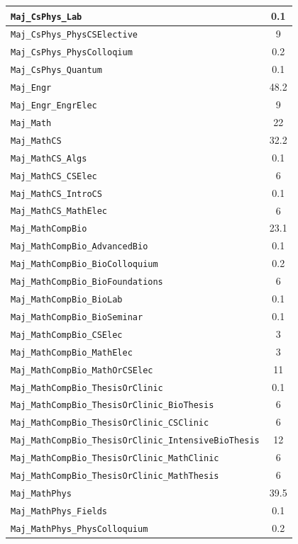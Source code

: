 \begin{longtable}{|p{}|c|}
    \verb|Maj_CsPhys_Lab| & 0.1\\\hline
    \verb|Maj_CsPhys_PhysCSElective| & 9\\\hline
    \verb|Maj_CsPhys_PhysColloqium| & 0.2\\\hline
    \verb|Maj_CsPhys_Quantum| & 0.1\\\hline
    \verb|Maj_Engr| & 48.2\\\hline
    \verb|Maj_Engr_EngrElec| & 9\\\hline
    \verb|Maj_Math| & 22\\\hline
    \verb|Maj_MathCS| & 32.2\\\hline
    \verb|Maj_MathCS_Algs| & 0.1\\\hline
    \verb|Maj_MathCS_CSElec| & 6\\\hline
    \verb|Maj_MathCS_IntroCS| & 0.1\\\hline
    \verb|Maj_MathCS_MathElec| & 6\\\hline
    \verb|Maj_MathCompBio| & 23.1\\\hline
    \verb|Maj_MathCompBio_AdvancedBio| & 0.1\\\hline
    \verb|Maj_MathCompBio_BioColloquium| & 0.2\\\hline
    \verb|Maj_MathCompBio_BioFoundations| & 6\\\hline
    \verb|Maj_MathCompBio_BioLab| & 0.1\\\hline
    \verb|Maj_MathCompBio_BioSeminar| & 0.1\\\hline
    \verb|Maj_MathCompBio_CSElec| & 3\\\hline
    \verb|Maj_MathCompBio_MathElec| & 3\\\hline
    \verb|Maj_MathCompBio_MathOrCSElec| & 11\\\hline
    \verb|Maj_MathCompBio_ThesisOrClinic| & 0.1\\\hline
    \verb|Maj_MathCompBio_ThesisOrClinic_BioThesis| & 6\\\hline
    \verb|Maj_MathCompBio_ThesisOrClinic_CSClinic| & 6\\\hline
    \verb|Maj_MathCompBio_ThesisOrClinic_IntensiveBioThesis| & 12\\\hline
    \verb|Maj_MathCompBio_ThesisOrClinic_MathClinic| & 6\\\hline
    \verb|Maj_MathCompBio_ThesisOrClinic_MathThesis| & 6\\\hline
    \verb|Maj_MathPhys| & 39.5\\\hline
    \verb|Maj_MathPhys_Fields| & 0.1\\\hline
    \verb|Maj_MathPhys_PhysColloquium| & 0.2\\\hline

\end{longtable}
